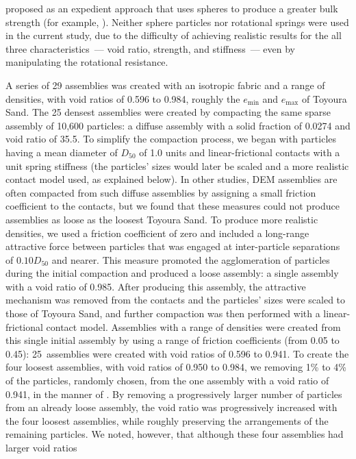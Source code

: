\documentclass[letterpaper,11pt]{article}
\begin{document}
proposed as
an expedient approach that uses spheres to produce a greater bulk strength
(for example, \cite{Huang:2017a}).
Neither sphere particles nor
rotational springs were used in the current study,
due to the difficulty of achieving realistic results
for the all three characteristics~--- void ratio,
strength, and stiffness~---
even by manipulating the rotational resistance. 
\par
A series of 29 assemblies was created with 
an isotropic fabric and a range of densities,
with void ratios of 0.596 to 0.984,
roughly the $e_{\text{min}}$
and $e_{\text{max}}$ of Toyoura Sand.
The 25 densest assemblies were created by compacting
the same sparse assembly of 10,600 particles:
a diffuse assembly with a solid fraction of 0.0274 and void
ratio of 35.5.
To simplify the compaction process, we began with particles
having a mean diameter of $D_{50}$ of 1.0 units and linear-frictional
contacts with a unit spring stiffness (the particles' sizes
would later be scaled and a more realistic contact model used,
as explained below).
In other studies,
DEM assemblies are often
compacted from such diffuse assemblies by assigning a
small friction coefficient to the contacts,
but we found that these measures could not produce assemblies as loose
as the loosest Toyoura Sand.
To produce more realistic densities,
we used a friction coefficient of zero and included a
long-range attractive force between particles that was engaged
at inter-particle separations of $0.10 D_{50}$ and nearer.
This measure promoted the agglomeration of particles during
the initial compaction and produced a loose assembly:
a single assembly with a void ratio of 0.985.
After producing this assembly, the attractive mechanism
was removed from the contacts and the particles' sizes were
scaled to those of Toyoura Sand, and further compaction
was then performed with a linear-frictional contact model.
Assemblies with a range of densities were created from this
single initial assembly by using a range of
friction coefficients (from 0.05 to 0.45):
25~assemblies were created with void ratios of 0.596 to 0.941.
To create the four loosest assemblies, with void ratios of 0.950 to 0.984,
we removing 1\% to 4\% of the
particles, randomly chosen, from the one assembly with a void ratio
of 0.941, in the manner of \cite{Nguyen:2018a}.
By removing a progressively larger number of particles from
an already loose assembly,
the void ratio was progressively increased with the four loosest
assemblies, while roughly preserving the arrangements of the remaining particles.
We noted, however, that although these four assemblies had larger void ratios
\end{document}
